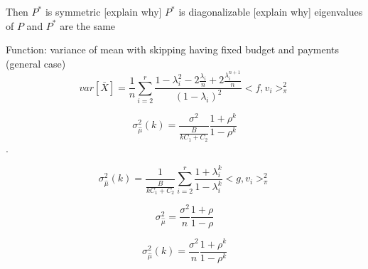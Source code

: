 \documentclass[12pt]{report}
\begin{document}
Then 
$P^*$ is symmetric [explain why]
$P^*$ is diagonalizable [explain why]
eigenvalues of $P$ and $P^*$ are the same


Function: variance of mean with skipping having fixed budget and payments (general case)
$$ var\left[\bar{X} \right] = \frac{1}{n} \sum_{i=2}^r\frac{1-\lambda_i^2 - 2\frac{\lambda_i}{n} + 2\frac{\lambda_i^{n+1}}{n}}{(1 - \lambda_i)^2} <f, v_i>^2_{\pi}$$



$$ \sigma_{\hat{\mu}}^2(k) = \frac{\sigma^2}{\frac{B}{kC_1 + C_2}} \frac{1+\rho^{k}}{1-\rho^{k}}$$.

$$  \sigma_{\hat{\mu}}^2(k) = \frac{1}{\frac{B}{kC_1 + C_2}} \sum_{i=2}^r\frac{1 + \lambda_i^k}{1 - \lambda_i^k} <g, v_i>^2_{\pi}$$



$$\sigma_{\hat{\mu}}^2 = \frac{\sigma^2}{n} \frac{1+\rho}{1-\rho}$$

$$\sigma_{\hat{\mu}}^2(k) = \frac{\sigma^2}{n} \frac{1+\rho^k}{1-\rho^k}$$
\end{document}
